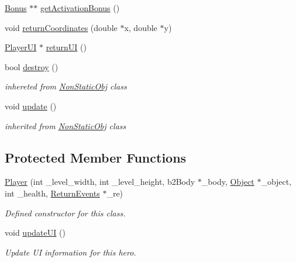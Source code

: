 \begin{DoxyCompactItemize}
\hyperlink{class_bonus}{Bonus} $\ast$$\ast$ \hyperlink{class_player_ab62b84f866fb3075bfbf8ea455d73375}{get\+Activation\+Bonus} ()
\item 
void \hyperlink{class_player_ab3d8dc6872a9903ea2717b57d77790a3}{return\+Coordinates} (double $\ast$x, double $\ast$y)
\item 
\hyperlink{class_player_u_i}{Player\+UI} $\ast$ \hyperlink{class_player_aefa23e8642f25b0f7e72543599d567f6}{return\+UI} ()
\item 
\mbox{\label{class_player_ad4d4b9138657ce9cde8433a44b1c4225}} 
bool \hyperlink{class_player_ad4d4b9138657ce9cde8433a44b1c4225}{destroy} ()
\begin{DoxyCompactList}\small\item\em inhereted from \hyperlink{class_non_static_obj}{Non\+Static\+Obj} class \end{DoxyCompactList}\item 
\mbox{\label{class_player_a82c3476f3e65a4e2ac6bcd040771bdd4}} 
void \hyperlink{class_player_a82c3476f3e65a4e2ac6bcd040771bdd4}{update} ()
\begin{DoxyCompactList}\small\item\em inherited from \hyperlink{class_non_static_obj}{Non\+Static\+Obj} class \end{DoxyCompactList}\end{DoxyCompactItemize}
\subsection*{Protected Member Functions}
\begin{DoxyCompactItemize}
\item 
\hyperlink{class_player_abf1330c477ecd5d2c0154a4876cf4154}{Player} (int \+\_\+level\+\_\+width, int \+\_\+level\+\_\+height, b2\+Body $\ast$\+\_\+body, \hyperlink{class_object}{Object} $\ast$\+\_\+object, int \+\_\+health, \hyperlink{_events_8h_a51620cf702f1b8fdf47cd0a5cfa0ba4f}{Return\+Events} $\ast$\+\_\+re)
\begin{DoxyCompactList}\small\item\em Defined constructor for this class. \end{DoxyCompactList}\item 
\mbox{\label{class_player_add3d6c730bb80c4d3a125e41d5586007}} 
void \hyperlink{class_player_add3d6c730bb80c4d3a125e41d5586007}{update\+UI} ()
\begin{DoxyCompactList}\small\item\em Update UI information for this hero. \end{DoxyCompactList}\end{DoxyCompactItemize}
